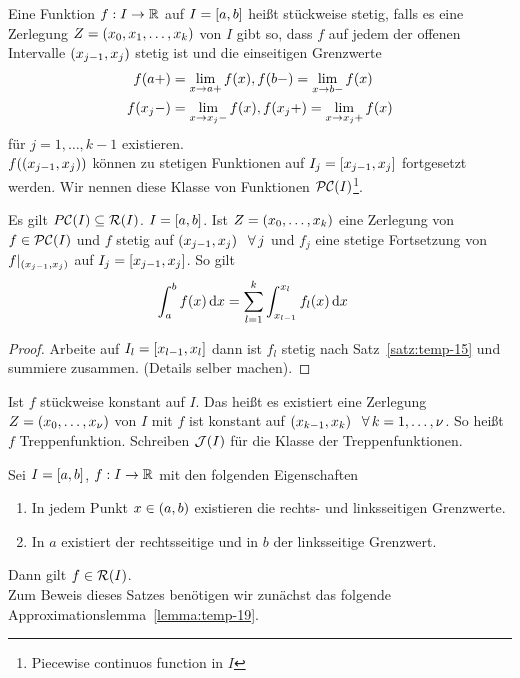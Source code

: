 \begin{definition}
    Eine Funktion $f: I\rightarrow{}\mathbb{R}$ auf $I=\left[a,b\right]$ heißt stückweise stetig, falls es eine Zerlegung $Z = \left(x_0, x_1, \dots, x_k\right)$ von $I$ gibt so, dass $f$ auf jedem der offenen Intervalle $\left(x_{j-1}, x_j\right)$ stetig ist und die einseitigen Grenzwerte
    \begin{align*}
        f\of{a+} &= \lim_{x\fromto a+} f\of{x}, f\of{b-} = \lim_{x\fromto b-} f\of{x}\\
        f\of{x_j-} &= \lim_{x\fromto x_j-} f\of{x}, f\of{x_j+} = \lim_{x\fromto x_j+} f\of{x}
    \end{align*}
    für $j=1, \dots, k-1$ existieren.\\
    $f\of{\pair{x_{j-1}, x_j}}$ können zu stetigen Funktionen auf $I_j=\left[x_{j-1}, x_j\right]$ fortgesetzt werden. Wir nennen diese Klasse von Funktionen $\mPC\of{I}$\footnote{Piecewise continuos function in $I$}.
\end{definition}

\begin{satz} %
    \label{satz:temp-17}
    Es gilt $P\mC\of{I} \subseteq \mR\of{I}$. $I=\left[a,b\right]$. Ist $Z=\left(x_0, \dots, x_k\right)$ eine Zerlegung von $f\in \mPC\of{I}$ und $f$ stetig auf $\left(x_{j-1}, x_j\right)~\;\forall\, j$ und $f_j$ eine stetige Fortsetzung von $f\vert_{\left(x_{j-1}, x_j\right)}$ auf $I_j = \left[x_{j-1}, x_j\right]$. So gilt
    \begin{align*}
        \int_{a}^{b} f\of{x} \dif x &= \sum_{l=1}^{k} \int_{x_{l-1}}^{x_l} f_l\of{x}\dif x
    \end{align*}
    \begin{proof}
        Arbeite auf $I_l = \left[x_{l-1}, x_{l}\right]$ dann ist $f_l$ stetig nach Satz~\ref{satz:temp-15} und summiere zusammen. (Details selber machen).
    \end{proof}
\end{satz}

\begin{bemerkung}[Treppenfunktion]
    Ist $f$ stückweise konstant auf $I$. Das heißt es existiert eine Zerlegung $Z=\left(x_0, \dots, x_{\nu}\right)$ von $I$ mit $f$ ist konstant auf $\left(x_{k-1}, x_k\right)~\;\forall\, k=1, \dots, \nu$. So heißt $f$ Treppenfunktion. Schreiben $\mJ\of{I}$ für die Klasse der Treppenfunktionen.
\end{bemerkung}

\begin{satz} %
    \label{satz:temp-18}
    \marginnote{[26. Apr]}
    Sei $I=\left[a,b\right]$, $f: I\rightarrow{}\mathbb{R}$ mit den folgenden Eigenschaften
    \begin{enumerate}[label=(\alph*)]
        \item In jedem Punkt $x\in\left(a,b\right)$ existieren die rechts- und linksseitigen Grenzwerte.
        \item In $a$ existiert der rechtsseitige und in $b$ der linksseitige Grenzwert.
    \end{enumerate}
    Dann gilt $f\in \mR\of{I}$.\\
    Zum Beweis dieses Satzes benötigen wir zunächst das folgende Approximationslemma~\ref{lemma:temp-19}.
\end{satz}

